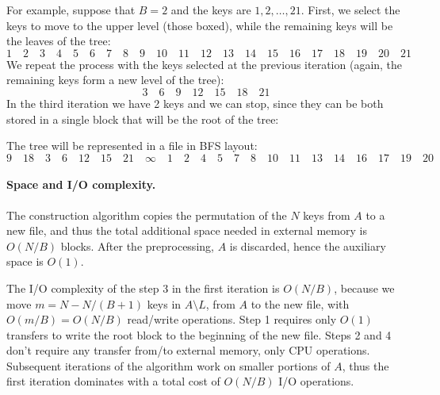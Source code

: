 For example, suppose that $B=2$ and the keys are $1, 2, \dots, 21$. First, we select the keys to move to the upper level (those boxed), while the remaining keys will be the leaves of the tree:
$$1 \quad 2 \quad \boxed{3} \quad 4 \quad 5 \quad \boxed{6} \quad 7 \quad 8 \quad \boxed{9} \quad  10 \quad 11 \quad \boxed{12} \quad 13 \quad 14 \quad \boxed{15} \quad 16 \quad 17 \quad \boxed{18} \quad 19 \quad 20 \quad \boxed{21} $$
We repeat the process with the keys selected at the previous iteration (again, the remaining keys form a new level of the tree):
$$3 \quad 6 \quad \boxed{9} \quad 12 \quad 15 \quad \boxed{18} \quad 21$$
In the third iteration we have 2 keys and we can stop, since they can be both stored in a single block that will be the root of the tree:
\begin{center}
\end{center}
The tree will be represented in a file in BFS layout:
$$9 \quad 18 \quad 3 \quad 6 \quad 12 \quad 15 \quad 21 \quad \infty \quad 1 \quad 2 \quad 4 \quad 5 \quad 7 \quad 8 \quad 10 \quad 11 \quad 13 \quad 14 \quad 16 \quad 17 \quad 19 \quad 20$$

\paragraph{Space and I/O complexity.} The construction algorithm copies the permutation of the $N$ keys from $A$ to a new file, and thus the total additional space needed in external memory is $O(N/B)$ blocks. After the preprocessing, $A$ is discarded, hence the auxiliary space is $O(1)$.

The I/O complexity of the step 3 in the first iteration is $O(N/B)$, because we move $m=N-N/(B+1)$ keys in $A \setminus L$, from $A$ to the new file, with $O(m/B)=O(N/B)$ read/write operations. Step 1 requires only $O(1)$ transfers to write the root block to the beginning of the new file. Steps 2 and 4 don't require any transfer from/to external memory, only CPU operations. Subsequent iterations of the algorithm work on smaller portions of $A$, thus the first iteration dominates with a total cost of $O(N/B)$ I/O operations.
